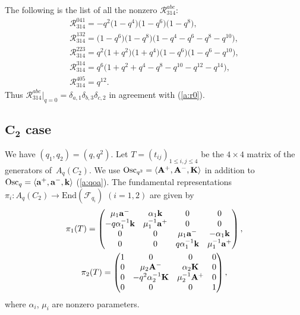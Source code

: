 \documentclass[pdftex]{sigma}
\begin{document}
\begin{example}\label{a:ex:a21}
The following is the list of all the nonzero $\mathscr{R}^{abc}_{314}$:
\begin{gather*}
\mathscr{R}^{041}_{314}  = -q^2 \big(1 - q^4\big) \big(1 - q^6\big) \big(1 - q^8\big), \\
%
\mathscr{R}^{132}_{314}  =\big(1 - q^6\big) \big(1 - q^8\big)\big(1 - q^4 - q^6 - q^8 - q^{10}\big),\\
%
\mathscr{R}^{223}_{314}  = q^2 \big(1 + q^2\big) \big(1 + q^4\big) \big(1 - q^6\big) \big(1 - q^6 - q^{10}\big), \\
%
\mathscr{R}^{314}_{314}  =q^6\big(1 + q^2 + q^4 - q^8 - q^{10} - q^{12} - q^{14}\big),\\
%
\mathscr{R}^{405}_{314}  =q^{12}.
\end{gather*}
Thus $\mathscr{R}^{abc}_{314}|_{q=0}=\delta_{a,1}\delta_{b,3}\delta_{c,2}$
in agreement with (\ref{a:r0}).
\end{example}


\subsection[$C_2$ case]{$\boldsymbol{C_2}$ case}\label{a:ss:c2}

We have $(q_1,q_2)=(q,q^2)$.
Let $T=(t_{ij})_{1\le i,j \le 4}$ be the
$4\times 4$ matrix of the generators of~$A_q(C_2)$.
We  use
$\mathrm{Osc}_{q^2} =
\langle  {\rm{\bf A}}^+, {\rm{\bf A}}^-, {\rm{\bf K}} \rangle$
in addition to
$\mathrm{Osc}_q =
\langle  {\rm{\bf a}}^+, {\rm{\bf a}}^-, {\rm{\bf k}} \rangle$
(\ref{a:qoa}).
The fundamental representations
$\pi_i: A_q(C_2) \rightarrow \mathrm{End}(\mathcal{F}_{q_i})$
$(i=1,2)$ are given by
\begin{gather}
\pi_1(T) =
\begin{pmatrix}
\mu_1{\rm{\bf a}}^- & \alpha_1{\rm {\bf k}} &  0& 0\\
-q\alpha^{-1}_1{\rm {\bf k}}& \mu^{-1}_1{\rm{\bf a}}^+ &  0& 0\\
0 & 0 & \mu_1{\rm{\bf a}}^- & -\alpha_1{\rm {\bf k}} \\
0 & 0 & q\alpha_1^{-1}{\rm {\bf k}} & \mu_1^{-1}{\rm{\bf a}}^+
\end{pmatrix},
\nonumber\\
\pi_2(T) =
\begin{pmatrix}
1  & 0 & 0 & 0 \\
0 & \mu_2{\rm{\bf A}}^- & \alpha_2{\rm{\bf K}} & 0 \\
0 & -q^2\alpha^{-1}_2{\rm{\bf K}} & \mu_2^{-1}{\rm{\bf A}}^+ & 0 \\
0 & 0 & 0  & 1
\end{pmatrix},\label{a:piTc}
\end{gather}
where $\alpha_i$, $\mu_i$ are nonzero parameters.
\end{document}
